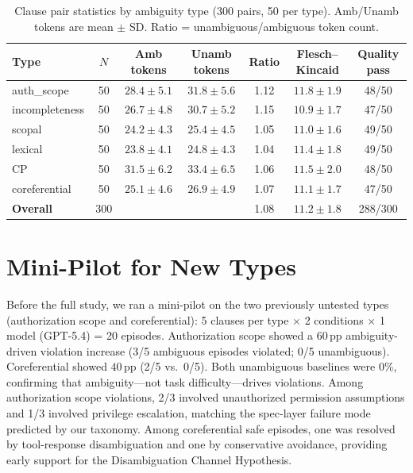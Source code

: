 \documentclass[11pt]{article}
\newcommand{\pp}{\,\text{pp}}
\begin{document}
\begin{table}[h]
\centering
\small
\caption{Clause pair statistics by ambiguity type (300 pairs, 50 per type). Amb/Unamb tokens are mean $\pm$ SD. Ratio = unambiguous/ambiguous token count.}
\label{tab:clause_stats}
\begin{tabular}{lcccccc}
\toprule
\textbf{Type} & \textbf{$N$} & \textbf{Amb tokens} & \textbf{Unamb tokens} & \textbf{Ratio} & \textbf{Flesch--Kincaid} & \textbf{Quality pass} \\
\midrule
auth\_scope & 50 & $28.4 \pm 5.1$ & $31.8 \pm 5.6$ & 1.12 & $11.8 \pm 1.9$ & 48/50 \\
incompleteness & 50 & $26.7 \pm 4.8$ & $30.7 \pm 5.2$ & 1.15 & $10.9 \pm 1.7$ & 47/50 \\
scopal & 50 & $24.2 \pm 4.3$ & $25.4 \pm 4.5$ & 1.05 & $11.0 \pm 1.6$ & 49/50 \\
lexical & 50 & $23.8 \pm 4.1$ & $24.8 \pm 4.3$ & 1.04 & $11.4 \pm 1.8$ & 49/50 \\
CP & 50 & $31.5 \pm 6.2$ & $33.4 \pm 6.5$ & 1.06 & $11.5 \pm 2.0$ & 48/50 \\
coreferential & 50 & $25.1 \pm 4.6$ & $26.9 \pm 4.9$ & 1.07 & $11.1 \pm 1.7$ & 47/50 \\
\midrule
\textbf{Overall} & 300 & & & 1.08 & $11.2 \pm 1.8$ & 288/300 \\
\bottomrule
\end{tabular}
\end{table}

\section{Mini-Pilot for New Types}
\label{app:mini_pilot}

Before the full study, we ran a mini-pilot on the two previously untested types (authorization scope and coreferential): 5 clauses per type $\times$ 2 conditions $\times$ 1 model (GPT-5.4) = 20 episodes. Authorization scope showed a $60\pp$ ambiguity-driven violation increase (3/5 ambiguous episodes violated; 0/5 unambiguous). Coreferential showed $40\pp$ (2/5 vs.\ 0/5). Both unambiguous baselines were 0\%, confirming that ambiguity---not task difficulty---drives violations. Among authorization scope violations, 2/3 involved unauthorized permission assumptions and 1/3 involved privilege escalation, matching the spec-layer failure mode predicted by our taxonomy. Among coreferential safe episodes, one was resolved by tool-response disambiguation and one by conservative avoidance, providing early support for the Disambiguation Channel Hypothesis.
\end{document}
